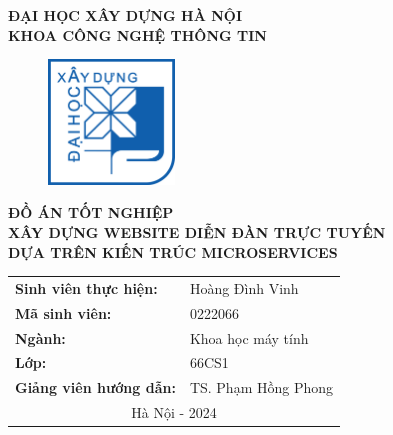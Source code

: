 \documentclass[../index.tex]{subfiles}
\begin{document}
  
  \begin{center}
    {\textbf{\large{ĐẠI HỌC XÂY DỰNG HÀ NỘI\\[0.2cm]KHOA CÔNG NGHỆ THÔNG TIN\\}}}
    \vspace{1.5cm}
    \begin{figure}[h]
      \centering
      \includegraphics[width=0.3\textwidth]{figures/huce_logo.png}
    \end{figure}
    \vspace{1.5cm}
    {\textbf{\huge{ĐỒ ÁN TỐT NGHIỆP\\}}}
    \vspace{1cm}
    {\textbf{XÂY DỰNG WEBSITE DIỄN ĐÀN TRỰC TUYẾN\\DỰA TRÊN KIẾN TRÚC MICROSERVICES\\}}
    \vspace{1cm}

    \begin{table}[h]
      \centering
      \begin{tabular}{ll}
        \textbf{Sinh viên thực hiện:}    & Hoàng Đình Vinh      \\[0.3cm]
        \textbf{Mã sinh viên:}           & 0222066              \\[0.3cm]
        \textbf{Ngành:}                  & Khoa học máy tính    \\[0.3cm]
        \textbf{Lớp:}                    & 66CS1                \\[0.3cm]
        \textbf{Giảng viên hướng dẫn:}   & TS. Phạm Hồng Phong \\[2cm]
        \multicolumn{2}{c}{Hà Nội - 2024}
      \end{tabular}
    \end{table}
  \end{center}
\end{document}
